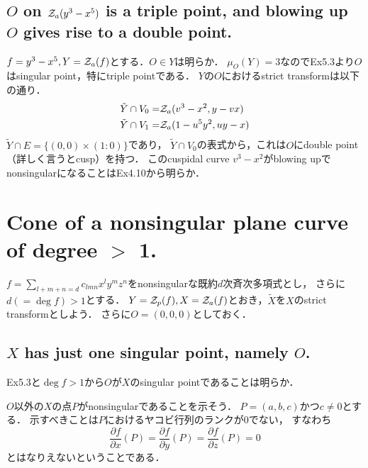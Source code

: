 \documentclass[a4paper]{jsarticle}
\begin{document}
    \subsection{$O$ on $\mathcal{Z}_a(y^3-x^5)$ is a triple point, and blowing up $O$ gives rise to a double point.}
    $f=y^3-x^5, Y=\mathcal{Z}_a(f)$とする．$O \in Y$は明らか．
    $\mu_O(Y)=3$なのでEx5.3より$O$はsingular point，特にtriple pointである．
    $Y$の$O$におけるstrict transformは以下の通り．
    \begin{align*}
        \tilde{Y} \cap V_0=& \mathcal{Z}_a(v^3-x^2, y-vx) \\
        \tilde{Y} \cap V_1=& \mathcal{Z}_a(1-u^5 y^2, uy-x)
    \end{align*}
    $\tilde{Y} \cap E=\{ (0,0) \times (1:0) \}$であり，
    $\tilde{Y} \cap V_0$の表式から，これは$O$にdouble point（詳しく言うとcusp）を持つ．
    このcuspidal curve $v^3-x^2$がblowing upでnonsingularになることはEx4.10から明らか．

\section{Cone of a nonsingular plane curve of degree $>$ 1.} %
    $f=\sum_{l+m+n=d}{c_{lmn} x^l y^m z^n}$をnonsingularな既約$d$次斉次多項式とし，
    さらに$d(=\deg f) >1$とする．
    $Y=\mathcal{Z}_p(f), X=\mathcal{Z}_a(f)$とおき，$\tilde{X}$を$X$のstrict transformとしよう．
    さらに$O=(0,0,0)$としておく．

    \subsection{$X$ has just one singular point, namely $O$.}
    Ex5.3と$\deg f>1$から$O$が$X$のsingular pointであることは明らか．

    $O$以外の$X$の点$P$がnonsingularであることを示そう．
    $P=(a,b,c)$かつ$c \neq 0$とする．
    示すべきことは$P$におけるヤコビ行列のランクが0でない，
    すなわち
    \[ \frac{\partial f}{\partial x}(P)=\frac{\partial f}{\partial y}(P)=\frac{\partial f}{\partial z}(P)=0 \]
    とはなりえないということである．
\end{document}
